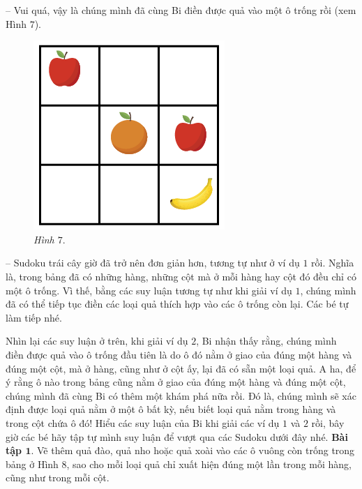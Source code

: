 	\begin{multicols}{2}
	-- Vui quá, vậy là chúng mình đã cùng Bi điền được quả vào một ô trống rồi (xem Hình $7$).
		\begin{figure}[H]
		\vspace*{-5pt}
		\centering
		\captionsetup{labelformat=empty, justification=centering}
		\includegraphics[scale=0.4]{hinh7}
		\caption{\textit{\small Hình $7.$}}
		\vspace*{-5pt}
		\end{figure}
		-- Sudoku trái cây giờ đã trở nên đơn giản hơn, tương tự như ở ví dụ $1$ rồi. Nghĩa là, trong bảng đã có những hàng, những cột mà ở mỗi hàng hay cột đó đều chỉ có một ô trống. Vì thế, bằng các suy luận tương tự như khi giải ví dụ $1$, chúng mình đã có thể tiếp tục điền các loại quả thích hợp vào các ô trống còn lại. Các bé tự làm tiếp nhé.
	\end{multicols}
	\vskip 0.1cm
	Nhìn lại các suy luận ở trên, khi giải ví dụ $2$, Bi nhận thấy rằng, chúng mình điền được quả vào ô trống đầu tiên là do ô đó nằm ở giao của đúng một hàng và đúng một cột, mà ở hàng, cũng như ở cột ấy, lại đã có sẵn một loại quả. A ha, để ý rằng ô nào trong bảng cũng nằm ở giao của đúng một hàng và đúng một cột, chúng mình đã cùng Bi có thêm một khám phá nữa rồi. Đó là, chúng mình sẽ xác định được loại quả nằm ở một ô bất kỳ, nếu biết loại quả nằm trong hàng và trong cột chứa ô đó!
	\vskip 0.1cm
	Hiểu các suy luận của Bi khi giải các ví dụ $1$ và $2$ rồi, bây giờ các bé hãy tập tự mình suy luận để vượt qua các Sudoku dưới đây nhé.
	\vskip 0.1cm
	\textbf{Bài tập $\pmb{1.}$} Vẽ thêm quả đào, quả nho hoặc quả xoài vào các ô vuông còn trống trong bảng ở Hình $8$, sao cho mỗi loại quả chỉ xuất hiện đúng một lần trong mỗi hàng, cũng như trong mỗi cột.
	\vskip 0.3cm
